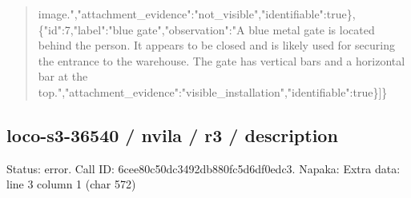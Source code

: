 \documentclass[10pt,a4paper]{article}
\begin{document}
\begin{quote}
image.",\allowbreak{}"attachment\_evidence":\allowbreak{}"n\allowbreak{}ot\_visible",\allowbreak{}"identifiable":\allowbreak{}true\}\allowbreak{},\allowbreak{}\{"id":\allowbreak{}7,\allowbreak{}"label":\allowbreak{}"blue gate",\allowbreak{}"observation":\allowbreak{}"A blue metal gate is located behind the person. It appears to be closed and is likely used for securing the entrance to the warehouse. The gate has vertical bars and a horizontal bar at the top.",\allowbreak{}"attachment\_evidence":\allowbreak{}"vis\allowbreak{}ible\_installation",\allowbreak{}"identifiable\allowbreak{}":\allowbreak{}true\}]\}
\end{quote}
\subsection*{loco-s3-36540 / nvila / r3 / description}
Status: error. Call ID: 6cee80c50dc3492db880fc5d6df0edc3. Napaka: Extra data: line 3 column 1 (char 572)
\end{document}

